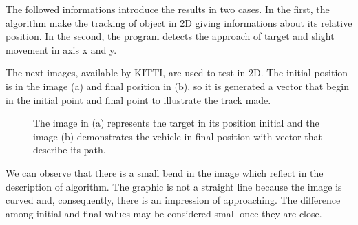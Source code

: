 The followed informations introduce the results in two cases. 
In the first, the algorithm make the tracking of object in 2D 
giving informations about its relative position. 
In the second, the program detects the approach of target and 
slight movement in axis x and y.


The next images, available by KITTI, are used to test in 2D. 
The initial position is in the image (a) and final position in (b), 
so it is generated a vector that begin in the initial point and final 
point to illustrate the track made.

\begin{figure}[H]
\centering
  \caption{The image in (a) represents the target in its position 
  initial and the image (b) demonstrates the vehicle in final position with vector 
  that describe its path.}
\end{figure}


We can observe that there is a small bend in the image which 
reflect in the description of algorithm. 
The graphic is not a straight line because the image is curved and,
consequently, there is an impression of approaching. The difference among initial 
and final values may be considered small once they are close.


